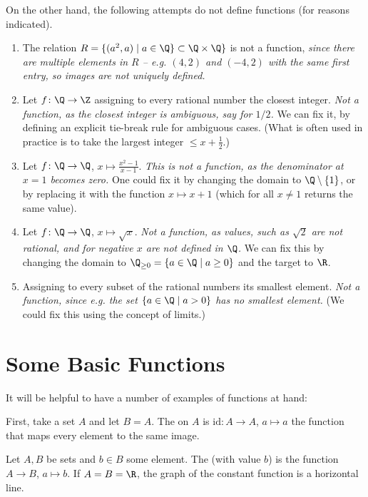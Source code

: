 On the other hand, the following attempts do not define functions (for
reasons indicated).
\begin{enumerate}
\item The relation $R=\{(a^2,a)\mid a\in\Q\}\subset\Q\times\Q\}$ is not a
function, {\em since there are multiple elements in $R$ -- e.g. $(4,2)$ and
$(-4,2)$ with the same first entry, so images are not uniquely defined.}
\item
Let $f\colon\Q\to\Z$ assigning to every rational number the
closest integer. {\em Not a function, as the closest integer is ambiguous,
say for $1/2$.} We can fix it, by defining an explicit tie-break rule for
ambiguous cases. (What is often used in practice is to take the largest integer $\le
x+\frac{1}{2}$.)
\item
Let $f\colon\Q\to\Q$, $x\mapsto\frac{x^2-1}{x-1}$. {\em This is not a function,
as the denominator at $x=1$ becomes zero.} One could fix it by changing the
domain to $\Q\setminus\{1\}$, or by replacing it with the function $x\mapsto
x+1$ (which for all $x\not=1$ returns the same value).
\item
Let $f\colon\Q\to\Q$, $x\mapsto\sqrt{x}$. {\em Not a function, as values,
such as $\sqrt{2}$ are not rational, and for negative $x$ are not defined in $\Q$.}
We can fix this by changing the domain to $\Q_{\ge 0}=\{a\in\Q\mid
a\ge 0\}$ and the target to $\R$.
\item Assigning to every subset of the rational numbers its smallest
element. {\em Not a function, since e.g. the set $\{a\in\Q\mid a>0\}$ has no
smallest element.} (We could fix this using the concept of
limits.)
\end{enumerate}

\section{Some Basic Functions}

It will be helpful to have a number of examples of functions at hand:
\medskip

First, take a set $A$ and let $B=A$. The  on $A$ is
$\mbox{id}\colon A\to A$, $a\mapsto a$ the function that maps every element to the same
image.

\medskip
Let $A,B$ be sets and $b\in B$ some element. The  (with value
$b$) is the function $A\to B$, $a\mapsto b$. If $A=B=\R$, the graph of the constant
function is a horizontal line.

\medskip

